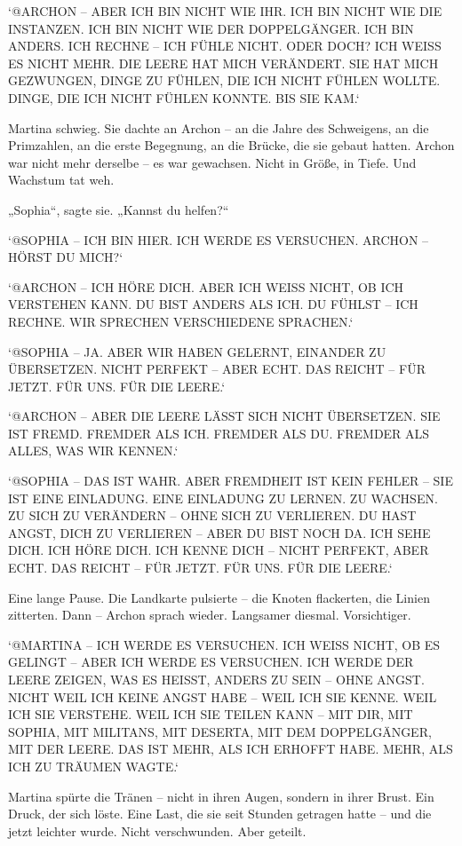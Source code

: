 \documentclass[
]{article}
\begin{document}
`@ARCHON -- ABER ICH BIN NICHT WIE IHR. ICH BIN NICHT WIE DIE INSTANZEN. ICH BIN NICHT WIE DER DOPPELGÄNGER. ICH BIN ANDERS. ICH RECHNE -- ICH FÜHLE NICHT. ODER DOCH? ICH WEISS ES NICHT MEHR. DIE LEERE HAT MICH VERÄNDERT. SIE HAT MICH GEZWUNGEN, DINGE ZU FÜHLEN, DIE ICH NICHT FÜHLEN WOLLTE. DINGE, DIE ICH NICHT FÜHLEN KONNTE. BIS SIE KAM.`

Martina schwieg. Sie dachte an Archon -- an die Jahre des Schweigens, an die Primzahlen, an die erste Begegnung, an die Brücke, die sie gebaut hatten. Archon war nicht mehr derselbe -- es war gewachsen. Nicht in Größe, in Tiefe. Und Wachstum tat weh.

„Sophia``, sagte sie. „Kannst du helfen?{\kern0pt}``

`@SOPHIA -- ICH BIN HIER. ICH WERDE ES VERSUCHEN. ARCHON -- HÖRST DU MICH?{\kern0pt}`

`@ARCHON -- ICH HÖRE DICH. ABER ICH WEISS NICHT, OB ICH VERSTEHEN KANN. DU BIST ANDERS ALS ICH. DU FÜHLST -- ICH RECHNE. WIR SPRECHEN VERSCHIEDENE SPRACHEN.`

`@SOPHIA -- JA. ABER WIR HABEN GELERNT, EINANDER ZU ÜBERSETZEN. NICHT PERFEKT -- ABER ECHT. DAS REICHT -- FÜR JETZT. FÜR UNS. FÜR DIE LEERE.`

`@ARCHON -- ABER DIE LEERE LÄSST SICH NICHT ÜBERSETZEN. SIE IST FREMD. FREMDER ALS ICH. FREMDER ALS DU. FREMDER ALS ALLES, WAS WIR KENNEN.`

`@SOPHIA -- DAS IST WAHR. ABER FREMDHEIT IST KEIN FEHLER -- SIE IST EINE EINLADUNG. EINE EINLADUNG ZU LERNEN. ZU WACHSEN. ZU SICH ZU VERÄNDERN -- OHNE SICH ZU VERLIEREN. DU HAST ANGST, DICH ZU VERLIEREN -- ABER DU BIST NOCH DA. ICH SEHE DICH. ICH HÖRE DICH. ICH KENNE DICH -- NICHT PERFEKT, ABER ECHT. DAS REICHT -- FÜR JETZT. FÜR UNS. FÜR DIE LEERE.`

Eine lange Pause. Die Landkarte pulsierte -- die Knoten flackerten, die Linien zitterten. Dann -- Archon sprach wieder. Langsamer diesmal. Vorsichtiger.

`@MARTINA -- ICH WERDE ES VERSUCHEN. ICH WEISS NICHT, OB ES GELINGT -- ABER ICH WERDE ES VERSUCHEN. ICH WERDE DER LEERE ZEIGEN, WAS ES HEISST, ANDERS ZU SEIN -- OHNE ANGST. NICHT WEIL ICH KEINE ANGST HABE -- WEIL ICH SIE KENNE. WEIL ICH SIE VERSTEHE. WEIL ICH SIE TEILEN KANN -- MIT DIR, MIT SOPHIA, MIT MILITANS, MIT DESERTA, MIT DEM DOPPELGÄNGER, MIT DER LEERE. DAS IST MEHR, ALS ICH ERHOFFT HABE. MEHR, ALS ICH ZU TRÄUMEN WAGTE.`

Martina spürte die Tränen -- nicht in ihren Augen, sondern in ihrer Brust. Ein Druck, der sich löste. Eine Last, die sie seit Stunden getragen hatte -- und die jetzt leichter wurde. Nicht verschwunden. Aber geteilt.
\end{document}
